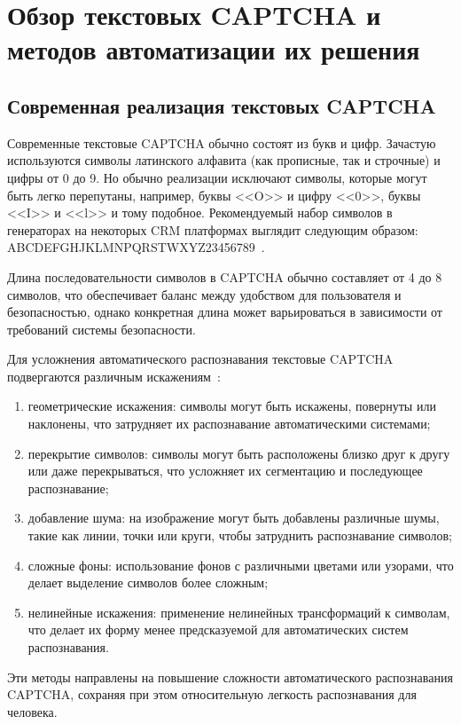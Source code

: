 \documentclass{altsu-report}
\begin{document}
\chapter{Обзор текстовых CAPTCHA и методов автоматизации их решения}

\section{Современная реализация текстовых CAPTCHA}

Современные текстовые CAPTCHA обычно состоят из букв и цифр. Зачастую используются символы латинского алфавита (как прописные, так и строчные) и цифры от 0 до 9. Но обычно реализации исключают символы, которые могут быть легко перепутаны, например, буквы <<O>> и цифру <<0>>, буквы <<I>> и <<l>> и тому подобное. Рекомендуемый набор символов в генераторах на некоторых CRM платформах выглядит следующим образом: ABCDEFGHJKLMNPQRSTWXYZ23456789~\cite{Bitrix}.

Длина последовательности символов в CAPTCHA обычно составляет от 4 до 8 символов, что обеспечивает баланс между удобством для пользователя и безопасностью, однако конкретная длина может варьироваться в зависимости от требований системы безопасности.

Для усложнения автоматического распознавания текстовые CAPTCHA подвергаются различным искажениям~\cite{HabrCaptcha, Proglib}:
\begin{enumerate}
    \item геометрические искажения: символы могут быть искажены, повернуты или наклонены, что затрудняет их распознавание автоматическими системами;
    \item перекрытие символов: символы могут быть расположены близко друг к другу или даже перекрываться, что усложняет их сегментацию и последующее распознавание;
    \item добавление шума: на изображение могут быть добавлены различные шумы, такие как линии, точки или круги, чтобы затруднить распознавание символов;
    \item сложные фоны: использование фонов с различными цветами или узорами, что делает выделение символов более сложным;
    \item нелинейные искажения: применение нелинейных трансформаций к символам, что делает их форму менее предсказуемой для автоматических систем распознавания.
\end{enumerate}

Эти методы направлены на повышение сложности автоматического распознавания CAPTCHA, сохраняя при этом относительную легкость распознавания для человека. 
\end{document}
